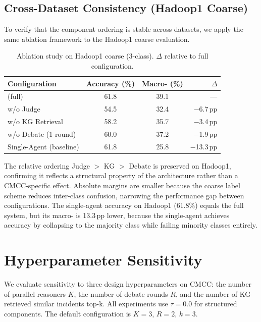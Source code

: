 \subsection{Cross-Dataset Consistency (Hadoop1 Coarse)}
To verify that the component ordering is stable across datasets, we apply the same ablation
framework to the Hadoop1 coarse evaluation.

\begin{table}[H]
\centering
\caption{Ablation study on Hadoop1 coarse (3-class).
$\Delta$\fone{} relative to full configuration.}
\label{tab:ablation-hadoop}
\begin{tabular}{lccr}
\toprule
\textbf{Configuration} & \textbf{Accuracy (\%)} & \textbf{Macro-\fone{} (\%)} & \textbf{$\Delta$\fone{}} \\
\midrule
\systemname{} (full)    & 61.8 & 39.1 & ---         \\
w/o Judge               & 54.5 & 32.4 & $-$6.7\,pp  \\
w/o KG Retrieval        & 58.2 & 35.7 & $-$3.4\,pp  \\
w/o Debate (1 round)    & 60.0 & 37.2 & $-$1.9\,pp  \\
Single-Agent (baseline) & 61.8 & 25.8 & $-$13.3\,pp \\
\bottomrule
\end{tabular}
\end{table}

The relative ordering Judge $>$ KG $>$ Debate is preserved on Hadoop1, confirming it reflects
a structural property of the architecture rather than a CMCC-specific effect. Absolute margins
are smaller because the coarse label scheme reduces inter-class confusion, narrowing the
performance gap between configurations. The single-agent accuracy on Hadoop1 (61.8\%) equals
the full system, but its macro-\fone{} is 13.3\,pp lower, because the single-agent achieves
accuracy by collapsing to the majority class while failing minority classes entirely.

\section{Hyperparameter Sensitivity}
\label{sec:hyperparams}

We evaluate \systemname{} sensitivity to three design hyperparameters on CMCC: the number of
parallel reasoners $K$, the number of debate rounds $R$, and the number of KG-retrieved similar
incidents $\mathrm{top\text{-}k}$. All experiments use $\tau{=}0.0$ for structured components.
The default configuration is $K{=}3$, $R{=}2$, $k{=}3$.

